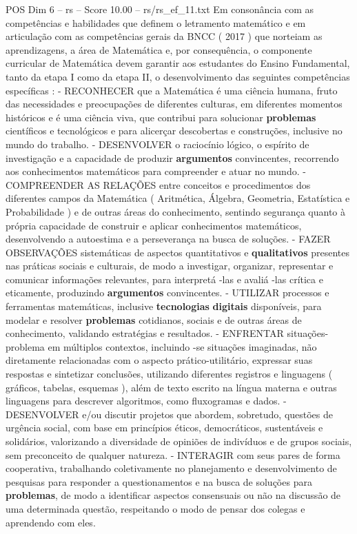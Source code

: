 \begin{textsample}{POS Dim 6 – rs – Score 10.00 – rs/rs\_ef\_11.txt}
Em consonância com as competências e habilidades que definem o letramento matemático e em articulação com as competências gerais da BNCC ( 2017 ) que norteiam as aprendizagens, a área de Matemática e, por consequência, o componente curricular de Matemática devem garantir aos estudantes do Ensino Fundamental, tanto da etapa I como da etapa II, o desenvolvimento das seguintes competências específicas : - RECONHECER que a Matemática é uma ciência humana, fruto das necessidades e preocupações de diferentes culturas, em diferentes momentos históricos e é uma ciência viva, que contribui para solucionar \textbf{problemas} científicos e tecnológicos e para alicerçar descobertas e construções, inclusive no mundo do trabalho. - DESENVOLVER o raciocínio lógico, o espírito de investigação e a capacidade de produzir \textbf{argumentos} convincentes, recorrendo aos conhecimentos matemáticos para compreender e atuar no mundo. - COMPREENDER AS RELAÇÕES entre conceitos e procedimentos dos diferentes campos da Matemática ( Aritmética, Álgebra, Geometria, Estatística e Probabilidade ) e de outras áreas do conhecimento, sentindo segurança quanto à própria capacidade de construir e aplicar conhecimentos matemáticos, desenvolvendo a autoestima e a perseverança na busca de soluções. - FAZER OBSERVAÇÕES sistemáticas de aspectos quantitativos e \textbf{qualitativos} presentes nas práticas sociais e culturais, de modo a investigar, organizar, representar e comunicar informações relevantes, para interpretá -las e avaliá -las crítica e eticamente, produzindo \textbf{argumentos} convincentes. - UTILIZAR processos e ferramentas matemáticas, inclusive \textbf{tecnologias} \textbf{digitais} disponíveis, para modelar e resolver \textbf{problemas} cotidianos, sociais e de outras áreas de conhecimento, validando estratégias e resultados. - ENFRENTAR situações-problema em múltiplos contextos, incluindo -se situações imaginadas, não diretamente relacionadas com o aspecto prático-utilitário, expressar suas respostas e sintetizar conclusões, utilizando diferentes registros e linguagens ( gráficos, tabelas, esquemas ), além de texto escrito na língua materna e outras linguagens para descrever algoritmos, como fluxogramas e dados. - DESENVOLVER e/ou discutir projetos que abordem, sobretudo, questões de urgência social, com base em princípios éticos, democráticos, sustentáveis e solidários, valorizando a diversidade de opiniões de indivíduos e de grupos sociais, sem preconceito de qualquer natureza. - INTERAGIR com seus pares de forma cooperativa, trabalhando coletivamente no planejamento e desenvolvimento de pesquisas para responder a questionamentos e na busca de soluções para \textbf{problemas}, de modo a identificar aspectos consensuais ou não na discussão de uma determinada questão, respeitando o modo de pensar dos colegas e aprendendo com eles.

\end{textsample}
